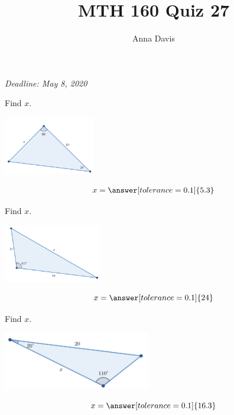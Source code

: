 \documentclass{ximera}
\author{Anna Davis} \title{MTH 160 Quiz 27}
\begin{document}
\begin{abstract}

\end{abstract}
\maketitle
 \textit{Deadline: May 8, 2020}
\begin{problem}\label{prob:quiz27prob1}
Find $x$.
\begin{image}
   
\includegraphics[height=1in]{test4mdiagram2.jpg}~
 
\end{image}
$$x=\answer[tolerance=0.1]{5.3}$$
\end{problem}

\begin{problem}\label{prob:quiz27prob2}
Find $x$.
\begin{image}
   
\includegraphics[height=1in]{test4mdiagram4.jpg}~
 
\end{image}
$$x=\answer[tolerance=0.1]{24}$$
\end{problem}

\begin{problem}\label{prob:quiz27prob3}
Find $x$.
\begin{image}
   
\includegraphics[height=1in]{test4mdiagram3.jpg}~
 
\end{image}
$$x=\answer[tolerance=0.1]{16.3}$$
\end{problem}
\end{document}
